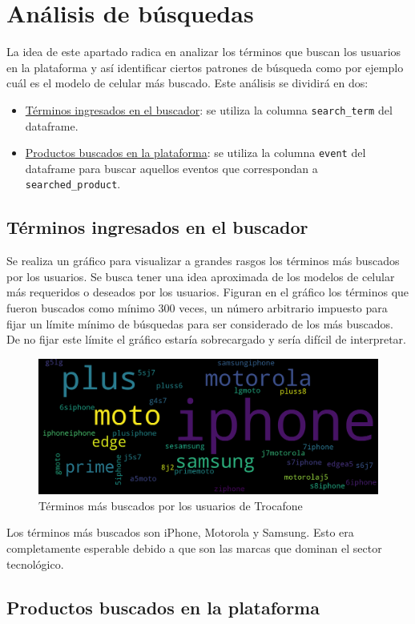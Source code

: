 \documentclass[a4paper]{article}
\begin{document}
\section{Análisis de búsquedas}

La idea de este apartado radica en analizar los términos que buscan los usuarios en la plataforma y así identificar ciertos patrones de búsqueda como por ejemplo cuál es el modelo de celular más buscado. Este análisis se dividirá en dos:

\begin{itemize}
	\item \underline{Términos ingresados en el buscador}: se utiliza la columna \texttt{search\_term} del dataframe.
	\item \underline{Productos buscados en la plataforma}: se utiliza la columna \texttt{event} del dataframe para buscar aquellos eventos que correspondan a \texttt{searched\_product}.
 \end{itemize}

\subsection{Términos ingresados en el buscador}

Se realiza un gráfico para visualizar a grandes rasgos los términos más buscados por los usuarios. Se busca tener una idea aproximada de los modelos de celular más requeridos o deseados por los usuarios. Figuran en el gráfico los términos que fueron buscados como mínimo 300 veces, un número arbitrario impuesto para fijar un límite mínimo de búsquedas para ser considerado de los más buscados. De no fijar este límite el gráfico estaría sobrecargado y sería difícil de interpretar.

\begin{figure}[h!]
	\includegraphics[width=\linewidth]{figures/07-search_terms-wordcloud.png}
	\caption{Términos más buscados por los usuarios de Trocafone}
	\label{searchedterm}
\end{figure}

Los términos más buscados son iPhone, Motorola y Samsung. Esto era completamente esperable debido a que son las marcas que dominan el sector tecnológico.

\subsection{Productos buscados en la plataforma}
\end{document}
